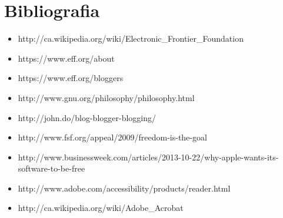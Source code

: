 \section{Bibliografia}

\begin{itemize}
\item{http://ca.wikipedia.org/wiki/Electronic\_Frontier\_Foundation}
\item{https://www.eff.org/about}
\item{https://www.eff.org/bloggers}
\item{http://www.gnu.org/philosophy/philosophy.html}
\item{http://john.do/blog-blogger-blogging/}
\item{http://www.fsf.org/appeal/2009/freedom-is-the-goal}
\item{http://www.businessweek.com/articles/2013-10-22/why-apple-wants-its-software-to-be-free}
\item{http://www.adobe.com/accessibility/products/reader.html}
\item{http://ca.wikipedia.org/wiki/Adobe\_Acrobat}
\end{itemize}






